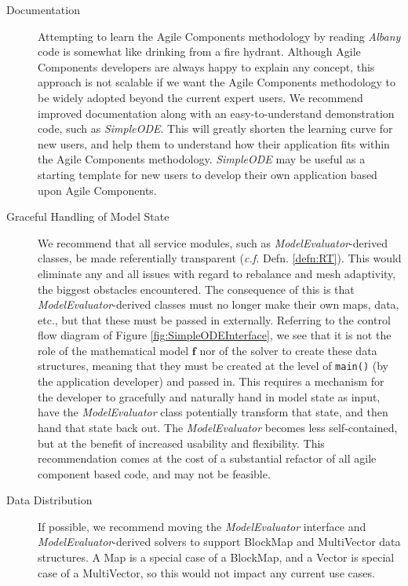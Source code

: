 \documentclass[10pt]{article}
\theoremstyle{plain}
\theoremstyle{definition}
\theoremstyle{remark}
\numberwithin{equation}{section}
\begin{document}
\begin{description}
  \item[Documentation] Attempting to learn the Agile Components methodology by reading \emph{Albany} code is somewhat like drinking from a fire hydrant. Although Agile Components developers are always happy to explain any concept, this approach is not scalable if we want the Agile Components methodology to be widely adopted beyond the current expert users. We recommend improved documentation along with an easy-to-understand demonstration code, such as \emph{SimpleODE}. This will greatly shorten the learning curve for new users, and help them to understand how their application fits within the Agile Components methodology. \emph{SimpleODE} may be useful as a starting template for new users to develop their own application based upon Agile Components.
  \item[Graceful Handling of Model State] We recommend that all service modules, such as \emph{ModelEvaluator}-derived classes, be made referentially transparent (\emph{c.f.} Defn. \ref{defn:RT}). This would eliminate any and all issues with regard to rebalance and mesh adaptivity, the biggest obstacles encountered. The consequence of this is that \emph{ModelEvaluator}-derived classes must no longer make their own maps, data, etc., but that these must be passed in externally. Referring to the control flow diagram of Figure \ref{fig:SimpleODEInterface}, we see that it is not the role of the mathematical model $\mathbf{f}$ nor of the solver to create these data structures, meaning that they must be created at the level of \verb"main()" (by the application developer) and passed in. This requires a mechanism for the developer to gracefully and naturally hand in model state as input, have the \emph{ModelEvaluator} class potentially transform that state, and then hand that state back out. The \emph{ModelEvaluator} becomes less self-contained, but at the benefit of increased usability and flexibility. This recommendation comes at the cost of a substantial refactor of all agile component based code, and may not be feasible.
  \item[Data Distribution] If possible, we recommend moving the \emph{ModelEvaluator} interface and \emph{ModelEvaluator}-derived solvers to support BlockMap and MultiVector data structures. A Map is a special case of a BlockMap, and a Vector is special case of a MultiVector, so this would not impact any current use cases.

\end{description}
\end{document}
